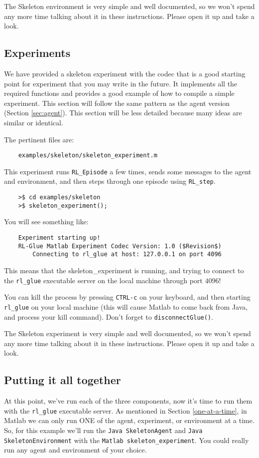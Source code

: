 \documentclass[11pt]{article}
\begin{document}
The Skeleton environment is very simple and well documented, so we won't spend any more time talking about it in these instructions.
Please open it up and take a look.


\subsection{Experiments}
We have provided a skeleton experiment with the codec that is a good starting point for experiment that you may write in the future.
It implements all the required functions and provides a good example of how to compile a simple experiment.  This section will follow the same 
pattern as the agent version (Section \ref{sec:agent}).  This section will be less detailed because many ideas are similar or identical.

The pertinent files are:
\begin{verbatim}
	examples/skeleton/skeleton_experiment.m
\end{verbatim}

This experiment runs \texttt{RL\_Episode} a few times, sends some messages to the agent and environment, and then steps through one episode using \texttt{RL\_step}.

\begin{verbatim}
	>$ cd examples/skeleton
	>$ skeleton_experiment();
\end{verbatim}

You will see something like:
\begin{verbatim}
	Experiment starting up!
	RL-Glue Matlab Experiment Codec Version: 1.0 ($Revision$)
	    Connecting to rl_glue at host: 127.0.0.1 on port 4096
\end{verbatim}

This means that the skeleton\_experiment is running, and trying to connect to the \texttt{rl\_glue} executable server on the local machine through port $4096$!  

You can kill the process by pressing \texttt{CTRL-c} on your keyboard, and then starting  \texttt{rl\_glue} on your local machine (this will cause Matlab to come back from Java, and 
process your kill command).  Don't forget to \texttt{disconnectGlue()}.

The Skeleton experiment is very simple and well documented, so we won't spend any more time talking about it in these instructions.
Please open it up and take a look.

\subsection{Putting it all together}
At this point, we've run each of the three components, now it's time to run them with the \texttt{rl\_glue} executable server.  As mentioned in Section \ref{one-at-a-time}, in Matlab we can 
only run ONE of the agent, experiment, or environment at a time.  So, for this example we'll run the \texttt{Java SkeletonAgent} and \texttt{Java SkeletonEnvironment} with the \texttt{Matlab skeleton\_experiment}.  You could really run any agent and environment of your choice.
\end{document}
